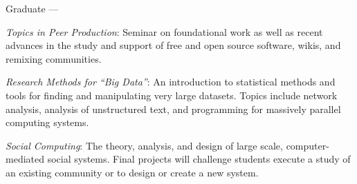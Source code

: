 \documentclass[10pt]{memoir}
\newenvironment{enumerate*}%
  {\begin{enumerate}%
    \setlength{\itemsep}{0pt}%
    \setlength{\parskip}{0pt}}%
  {\end{enumerate}}
\begin{document}
Graduate ---
\begin{enumerate*}
\item \emph{Topics in Peer Production}: Seminar on foundational work
  as well as recent advances in the study and support of free and open
  source software, wikis, and remixing communities.
\item \emph{Research Methods for ``Big Data''}: An introduction to
  statistical methods and tools for finding and manipulating very
  large datasets. Topics include network analysis, analysis of
  unstructured text, and programming for massively parallel computing
  systems.
\item \emph{Social Computing}: The theory, analysis, and design of
  large scale, computer-mediated social systems. Final projects will
  challenge students execute a study of an existing community or to
  design or create a new system.
\end{enumerate*}
\end{document}
